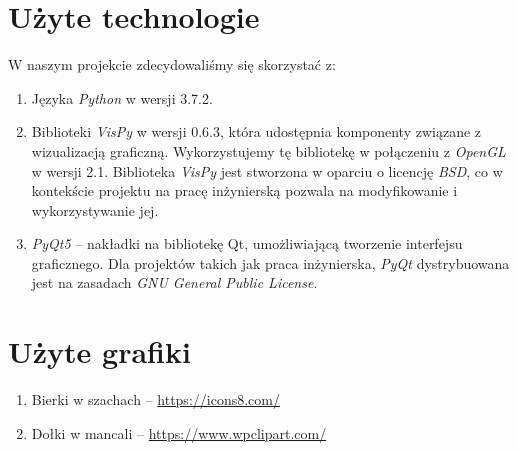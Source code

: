 \documentclass{article}
\let\oldsection\section
\renewcommand\section{\clearpage\oldsection}
\newcommand{\modulename}[1]{\textit{#1}}
\begin{document}
\section{Użyte technologie}
W naszym projekcie zdecydowaliśmy się skorzystać z:
\begin{enumerate}
	\item Języka \modulename{Python} w wersji 3.7.2.
	\item Biblioteki \modulename{VisPy} w wersji 0.6.3, która udostępnia komponenty związane z wizualizacją graficzną. Wykorzystujemy tę bibliotekę w połączeniu z \modulename{OpenGL} w wersji 2.1. Biblioteka \modulename{VisPy} jest stworzona w oparciu o licencję \modulename{BSD}, co w kontekście projektu na pracę inżynierską pozwala na modyfikowanie i wykorzystywanie jej.
	\item \modulename{PyQt5} – nakładki na bibliotekę Qt, umożliwiającą tworzenie interfejsu graficznego. Dla projektów takich jak praca inżynierska, \modulename{PyQt} dystrybuowana jest na zasadach \modulename{GNU General Public License}.
\end{enumerate}
\section{Użyte grafiki}
\begin{enumerate}
	\item Bierki w szachach – \url{https://icons8.com/}
	\item Dołki w mancali – \url{https://www.wpclipart.com/}
\end{enumerate}
\end{document}

